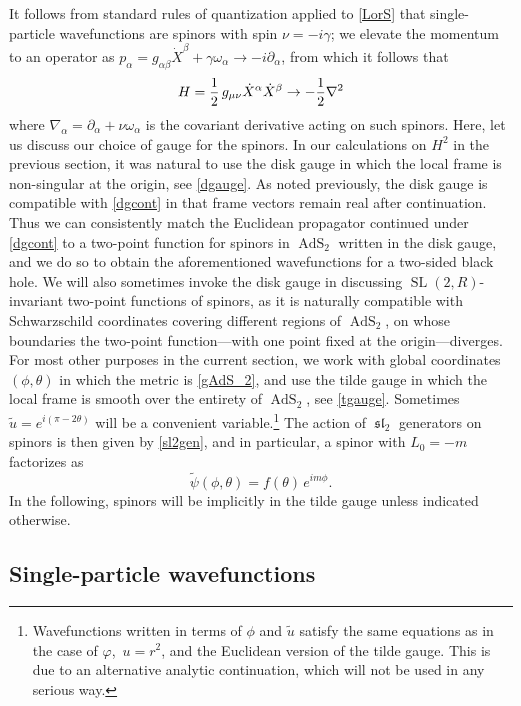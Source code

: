 \documentclass[12pt]{article}
\newcommand{\be}{\begin{equation}}
\newcommand{\ee}{\end{equation}}
\newcommand{\vp}{\varphi}
\newcommand{\RR}{\mathbb{R}}
\DeclareMathOperator{\sL}{\mathfrak{sl}}
\DeclareMathOperator{\tSL}{\widetilde{\mathrm{SL}}}
\DeclareMathOperator{\tAdS}{\widetilde{AdS}}
\DeclareMathOperator{\HH}{H}
\newcommand{\tpsi}{\tilde{\psi}}
\newcommand{\al}{\alpha}
\newcommand{\bt}{\beta}
\newcommand{\tht}{\theta}
\newcommand{\om}{\omega}
\newcommand{\ga}{\gamma}
\newcommand{\ov}{\over}
\newcommand{\p}{\partial}
\def\widetilde#1{#1}%
\def\HH{H}
\def\RR{R}
\begin{document}
It follows from standard rules of quantization applied to \eqref{LorS} that single-particle wavefunctions are spinors with spin $\nu=-i \ga$; we elevate the momentum to an operator as $p_{\al} =g_{\al\bt}\dot{X}^{\bt}+\ga \om_{\al} \to -i \p_{\al}$, from which it follows that 
\be \label{Ham}
H={1 \ov 2}\,g_{\mu\nu}\dot{X}^{\al}\dot{X}^{\bt} \to -{1 \ov 2}\nabla^2
\ee
where $\nabla_{\al}=\partial_{\al}+\nu\omega_{\al}$ is the covariant derivative acting on such spinors. Here, let us discuss our choice of gauge for the spinors. In our calculations on $\HH^2$ in the previous section, it was natural to use the disk gauge in which the local frame is non-singular at the origin, see \eqref{dgauge}. As noted previously, the disk gauge is compatible with \eqref{dgcont} in that frame vectors remain real after continuation. Thus we can consistently match the Euclidean propagator continued under \eqref{dgcont} to a two-point function for spinors in $\tAdS_2$ written in the disk gauge, and we do so to obtain the aforementioned wavefunctions for a two-sided black hole. We will also sometimes invoke the disk gauge in discussing $\tSL(2,\RR)$-invariant two-point functions of spinors, as it is naturally compatible with Schwarzschild coordinates covering different regions of $\tAdS_2$, on whose boundaries the two-point function---with one point fixed at the origin---diverges. For most other purposes in the current section, we work with global coordinates $(\phi,\theta)$ in which the metric is \eqref{gAdS_2}, and use the tilde gauge in which the local frame is smooth over the entirety of $\tAdS_2$, see \eqref{tgauge}. Sometimes $\tilde{u}=e^{i(\pi-2 \tht)}$ will be a convenient variable.\footnote{Wavefunctions written in terms of $\phi$ and $\tilde{u}$ satisfy the same equations as in the case of $\vp$,\, $u=r^2$, and the Euclidean version of the tilde gauge. This is due to an alternative analytic continuation, which will not be used in any serious way.} The action of $\sL_2$ generators on spinors is then given by \eqref{sl2gen}, and in particular, a spinor with $L_0=-m$ factorizes as
\be \label{tpsifact}
\tpsi(\phi, \tht)=f(\tht)\,e^{im\phi}.
\ee
In the following, spinors will be implicitly in the tilde gauge unless indicated otherwise.

\subsection{Single-particle wavefunctions} \label{sec:partwf}
\end{document}
